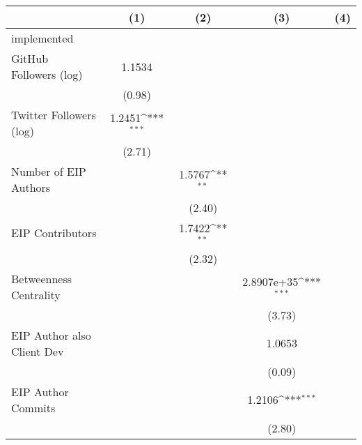 {
\def\sym#1{\ifmmode^{#1}\else\(^{#1}\)\fi}
\begin{tabular}{l*{4}{c}}
\hline\hline
                                   &\multicolumn{1}{c}{(1)}         &\multicolumn{1}{c}{(2)}         &\multicolumn{1}{c}{(3)}         &\multicolumn{1}{c}{(4)}         \\
\hline
implemented                        &                   &                   &                   &                   \\
GitHub Followers (log)             &    1.1534         &                   &                   &                   \\
                                   &    (0.98)         &                   &                   &                   \\
[1em]
Twitter Followers (log)            &    1.2451\sym{***}&                   &                   &                   \\
                                   &    (2.71)         &                   &                   &                   \\
[1em]
Number of EIP Authors              &                   &    1.5767\sym{**} &                   &                   \\
                                   &                   &    (2.40)         &                   &                   \\
[1em]
EIP Contributors                   &                   &    1.7422\sym{**} &                   &                   \\
                                   &                   &    (2.32)         &                   &                   \\
[1em]
Betweenness Centrality             &                   &                   &2.8907e+35\sym{***}&                   \\
                                   &                   &                   &    (3.73)         &                   \\
[1em]
EIP Author also Client Dev         &                   &                   &    1.0653         &                   \\
                                   &                   &                   &    (0.09)         &                   \\
[1em]
EIP Author Commits                 &                   &                   &    1.2106\sym{***}&                   \\
                                   &                   &                   &    (2.80)         &                   \\

\end{tabular}}
